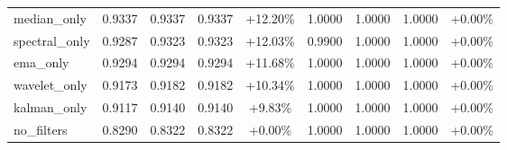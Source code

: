 \begin{table}[htbp]
\begin{adjustbox}{max width=\textwidth}
\begin{tabular}{l cccc cccc}
median\_only & 0.9337 & 0.9337 & 0.9337 & +12.20\% & 1.0000 & 1.0000 & 1.0000 & +0.00\% \\
spectral\_only & 0.9287 & 0.9323 & 0.9323 & +12.03\% & 0.9900 & 1.0000 & 1.0000 & +0.00\% \\
ema\_only & 0.9294 & 0.9294 & 0.9294 & +11.68\% & 1.0000 & 1.0000 & 1.0000 & +0.00\% \\
wavelet\_only & 0.9173 & 0.9182 & 0.9182 & +10.34\% & 1.0000 & 1.0000 & 1.0000 & +0.00\% \\
kalman\_only & 0.9117 & 0.9140 & 0.9140 & +9.83\% & 1.0000 & 1.0000 & 1.0000 & +0.00\% \\
no\_filters & 0.8290 & 0.8322 & 0.8322 & +0.00\% & 1.0000 & 1.0000 & 1.0000 & +0.00\% \\
\bottomrule
\end{tabular}
\end{adjustbox}
\end{table}
